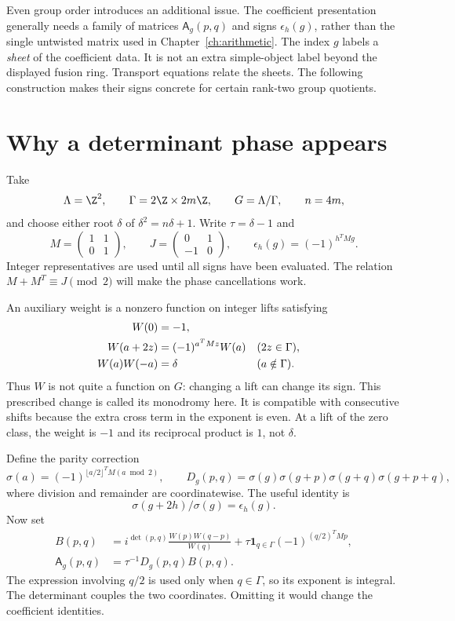 Even group order introduces an additional issue. The coefficient
presentation generally needs a family of matrices
$\mathsf A_g(p,q)$ and signs $\epsilon_h(g)$, rather than the
single untwisted matrix used in Chapter~\ref{ch:arithmetic}.
The index $g$ labels a \emph{sheet} of the coefficient data. It is
not an extra simple-object label beyond the displayed fusion ring.
Transport equations relate the sheets. The following construction
makes their signs concrete for certain rank-two group quotients.

\section{Why a determinant phase appears}

Take
\[
 \Lambda=\Z^2,\qquad \Gamma=2\Z\times2m\Z,
 \qquad G=\Lambda/\Gamma,\qquad n=4m,
\]
and choose either root $\delta$ of $\delta^2=n\delta+1$.
Write $\tau=\delta-1$ and
\[
 M=\begin{pmatrix}1&1\\0&1\end{pmatrix},\qquad
 J=\begin{pmatrix}0&1\\-1&0\end{pmatrix},\qquad
 \epsilon_h(g)=(-1)^{h^TMg}.
\]
Integer representatives are used until all signs have been evaluated.
The relation $M+M^T\equiv J\pmod2$ will make the phase cancellations
work.

An auxiliary weight is a nonzero function on integer lifts satisfying
\begin{align}
 W(0)&=-1,\notag\\
 W(a+2z)&=(-1)^{a^TMz}W(a)
       &&(2z\in\Gamma),\label{eq:noncyclic-monodromy}\\
 W(a)W(-a)&=\delta &&(a\notin\Gamma).
 \label{eq:noncyclic-reciprocity}
\end{align}
Thus $W$ is not quite a function on $G$: changing a lift can change
its sign. This prescribed change is called its monodromy here.
It is compatible with consecutive shifts because the extra cross
term in the exponent is even. At a lift of the zero class, the
weight is $-1$ and its reciprocal product is $1$, not $\delta$.

Define the parity correction
\[
 \sigma(a)=(-1)^{\lfloor a/2\rfloor^TM(a\bmod2)},\qquad
 D_g(p,q)=\sigma(g)\sigma(g+p)\sigma(g+q)\sigma(g+p+q),
\]
where division and remainder are coordinatewise. The useful identity is
\[
 \sigma(g+2h)/\sigma(g)=\epsilon_h(g).
\]
Now set
\begin{align}
 B(p,q)&=i^{\det(p,q)}\frac{W(p)W(q-p)}{W(q)}
 +\tau\mathbf1_{q\in\Gamma}(-1)^{(q/2)^TMp},
 \label{eq:noncyclic-B}\\
 \mathsf A_g(p,q)&=\tau^{-1}D_g(p,q)B(p,q).
 \label{eq:noncyclic-A}
\end{align}
The expression involving $q/2$ is used only when $q\in\Gamma$,
so its exponent is integral. The determinant couples the two
coordinates. Omitting it would change the coefficient identities.

